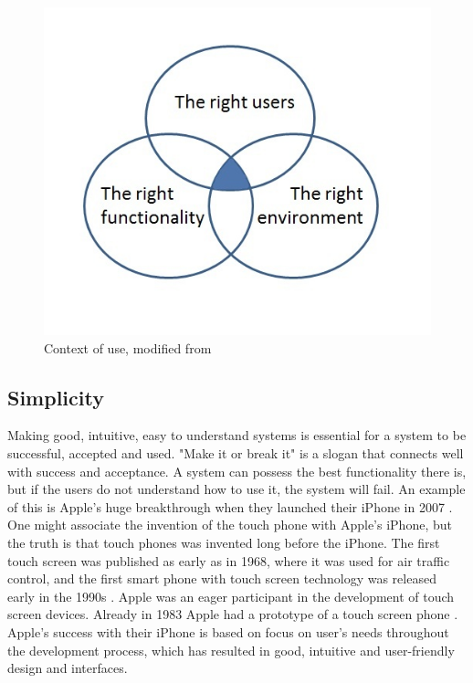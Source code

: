 \begin{figure} [ht!]
\centering
\includegraphics[scale=0.8]{contextOfUse.jpg}
\caption[Context of use]{Context of use, modified from \cite{contextofusefigure}}
\label{contextofuse}
\end{figure} 

\subsection{Simplicity}
Making good, intuitive, easy to understand systems is essential for a system to be successful, accepted and used. "Make it or break it" is a slogan that connects well with success and acceptance. A system can possess the best functionality there is, but if the users do not understand how to use it, the system will fail. An example of this is Apple's huge breakthrough when they launched their iPhone in 2007 \cite{iphone2007}. One might associate the invention of the touch phone with Apple's iPhone, but the truth is that touch phones was invented long before the iPhone. The first touch screen was published as early as in 1968, where it was used for air traffic control, and the first smart phone with touch screen technology was released early in the 1990s \cite{touchphone}. Apple was an eager participant in the development of touch screen devices. Already in 1983 Apple had a prototype of a touch screen phone \cite{applefirst1983}. Apple's success with their iPhone is based on focus on user's needs throughout the development process, which has resulted in good, intuitive and user-friendly design and interfaces. 

